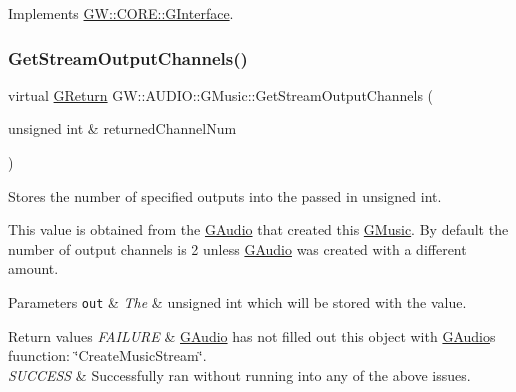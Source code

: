 Implements \hyperlink{classGW_1_1CORE_1_1GInterface_aacf5834174a7024f8a3c361122ee9e76}{G\+W\+::\+C\+O\+R\+E\+::\+G\+Interface}.

\mbox{\label{classGW_1_1AUDIO_1_1GMusic_a750dcb654e813c322d7617e1a5ebdf93}} 
\subsubsection{\texorpdfstring{Get\+Stream\+Output\+Channels()}{GetStreamOutputChannels()}}
{\footnotesize\ttfamily virtual \hyperlink{namespaceGW_a67a839e3df7ea8a5c5686613a7a3de21}{G\+Return} G\+W\+::\+A\+U\+D\+I\+O\+::\+G\+Music\+::\+Get\+Stream\+Output\+Channels (\begin{DoxyParamCaption}\item[{unsigned int \&}]{returned\+Channel\+Num }\end{DoxyParamCaption})\hspace{0.3cm}{\ttfamily [pure virtual]}}



Stores the number of specified outputs into the passed in unsigned int. 

This value is obtained from the \hyperlink{classGW_1_1AUDIO_1_1GAudio}{G\+Audio} that created this \hyperlink{classGW_1_1AUDIO_1_1GMusic}{G\+Music}. By default the number of output channels is 2 unless \hyperlink{classGW_1_1AUDIO_1_1GAudio}{G\+Audio} was created with a different amount.


\begin{DoxyParams}[1]{Parameters}
\mbox{\tt out}  & {\em The} & unsigned int which will be stored with the value.\\
\hline
\end{DoxyParams}

\begin{DoxyRetVals}{Return values}
{\em F\+A\+I\+L\+U\+RE} & \hyperlink{classGW_1_1AUDIO_1_1GAudio}{G\+Audio} has not filled out this object with \hyperlink{classGW_1_1AUDIO_1_1GAudio}{G\+Audio}\textquotesingle{}s fuunction\+: \char`\"{}\+Create\+Music\+Stream\char`\"{}. \\
\hline
{\em S\+U\+C\+C\+E\+SS} & Successfully ran without running into any of the above issues. \\
\hline
\end{DoxyRetVals}
\mbox{\label{classGW_1_1AUDIO_1_1GMusic_aef10f15b8487e18c2d65d1666ba64662}} 
